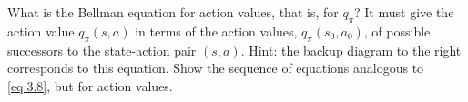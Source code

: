 
\begin{exercise}[Exercise 3.17]

What is the Bellman equation for action values, that is, for $q_\pi$?
It must give the action value $q_\pi(s, a)$ in terms of the action values, $q_\pi(s_0, a_0)$, of possible successors to the state-action pair $(s, a)$.
Hint:
the backup diagram to the right corresponds to this equation.
Show the sequence of equations analogous to \eqref{eq:3.8}, but for action values.

\end{exercise}


